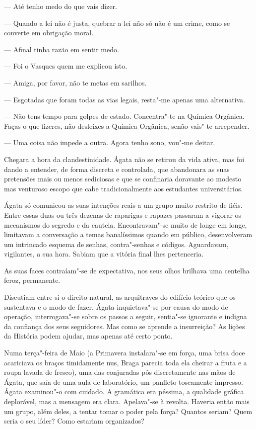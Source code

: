 --- Até tenho medo do que vais dizer.

--- Quando a lei não é justa, quebrar a lei não só não é um crime, como se
  converte em obrigação moral.

--- Afinal tinha razão em sentir medo.

--- Foi o Vasques quem me explicou isto.

--- Amiga, por favor, não te metas em sarilhos.

--- Esgotadas que foram todas as vias legais, resta"-me apenas uma
  alternativa.

--- Não tens tempo para golpes de estado. Concentra"-te na Química
  Orgânica. Faças o que fizeres, não desleixes a Química Orgânica, senão
  vais"-te arrepender.

--- Uma coisa não impede a outra. Agora tenho sono, vou"-me deitar.

Chegara a hora da clandestinidade. Ágata não se retirou da vida ativa,
mas foi dando a entender, de forma discreta e controlada, que abandonara
as suas pretensões mais ou menos sediciosas e que se confinaria
doravante ao modesto mas venturoso escopo que cabe tradicionalmente
aos estudantes universitários.

Ágata só comunicou as suas intenções reais a um grupo muito restrito de
fiéis. Entre essas duas ou três dezenas de raparigas e rapazes
passaram a vigorar os mecanismos do segredo e da cautela. Encontravam"-se
muito de longe em longe, limitavam a conversação a temas banalíssimos
quando em público, desenvolveram um intrincado esquema de senhas, contra"-senhas e códigos. Aguardavam, vigilantes, a sua hora. Sabiam que a
vitória final lhes pertenceria.

As suas faces contraíam"-se de expectativa, nos seus olhos brilhava uma
centelha feroz, permanente.

Discutiam entre si o direito natural, as arquitraves do edifício
teórico que os sustentava e o modo de fazer. Ágata inquietava"-se por
causa do modo de operação, interrogava"-se sobre os passos a seguir,
sentia"-se ignorante e indigna da confiança dos seus seguidores. Mas como
se aprende a insurreição? As lições da História podem ajudar, mas apenas
até certo ponto.

Numa terça"-feira de Maio (a Primavera instalara"-se em
força, uma brisa doce acariciava os braços timidamente nus, Braga
parecia toda ela cheirar a fruta e a roupa lavada de fresco), uma das
conjuradas pôs discretamente nas mãos de Ágata, que saía de uma aula de
laboratório, um panfleto toscamente impresso. Ágata examinou"-o com
cuidado. A gramática era péssima, a qualidade gráfica deplorável, mas a
mensagem era clara. Apelava"-se à revolta. Haveria então mais um grupo,
além deles, a tentar tomar o poder pela força? Quantos seriam?
Quem seria o seu líder? Como estariam organizados?

